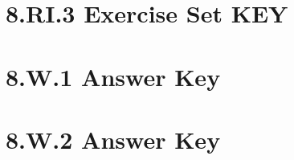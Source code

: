 \documentclass[a4paper,12pt]{article}
\begin{document}
\newpage
\section{8.RI.3 Exercise Set KEY}


\newpage
\section{8.W.1 Answer Key}




\newpage
\section{8.W.2 Answer Key}

\end{document}
